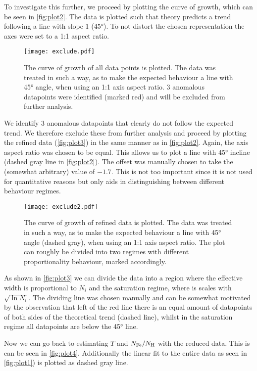 To investigate this further, we proceed by plotting the curve of growth, which can be seen in \autoref{fig:plot2}. The data is plotted such that theory predicts a trend following a line with slope 1 (\ang{45}). To not distort the chosen representation the axes were set to a 1:1 aspect ratio.
\begin{figure}[H]
	\centering
	\texttt{[image: exclude.pdf]}
	\caption{The curve of growth of all data points is plotted. The data was treated in such a way, as to make the expected behaviour a line with \ang{45} angle, when using an 1:1 axis aspect ratio. 3 anomalous datapoints were identified (marked red) and will be excluded from further analysis.}
	\label{fig:plot2}
\end{figure}
We identify 3 anomalous datapoints that clearly do not follow the expected trend. We therefore exclude these from further analysis and proceed by plotting the refined data (\autoref{fig:plot3}) in the same manner as in \autoref{fig:plot2}. Again, the axis aspect ratio was chosen to be equal. This allows us to plot a line with \ang{45} incline (dashed gray line in \autoref{fig:plot2}). The offset was manually chosen to take the (somewhat arbitrary) value of $-1.7$. This  is not too important since it is not used for quantitative reasons but only aids in distinguishing between different behaviour regimes. 

\begin{figure}[H]
	\centering
	\texttt{[image: exclude2.pdf]}
	\caption{The curve of growth of refined data is plotted. The data was treated in such a way, as to make the expected behaviour a line with \ang{45} angle (dashed gray), when using an 1:1 axis aspect ratio. The plot can roughly be divided into two regimes with different proportionality behaviour, marked accordingly.}
	\label{fig:plot3}
\end{figure}

As shown in \autoref{fig:plot3} we can divide the data into a region where the effective width is proportional to $N_i$ and the saturation regime, where is scales with $\sqrt{\ln N_i}$. The dividing line was chosen manually and can be somewhat motivated by the observation that left of the red line there is an equal amount of datapoints of both sides of the theoretical trend (dashed line), whilst in the saturation regime all datapoints are below the \ang{45} line.

Now we can go back to estimating $T$ and $N_{\text{Fe}}/N_{\text{H}}$ with the reduced data. This is can be seen in \autoref{fig:plot4}. Additionally the linear fit to the entire data as seen in \autoref{fig:plot1}) is plotted as dashed gray line.

